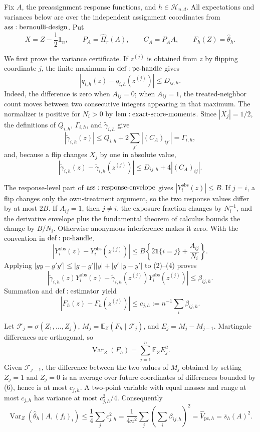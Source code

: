 Fix \(A\), the preassignment response functions, and \(h\in\mathcal H_{n,d}\).  All expectations and variances below are over the independent assignment coordinates from \({\rm ass:bernoulli\text{-}design}\).  Put
\[
 X=Z-\frac12\mathbf1_n,\qquad P_A=\widehat\Pi_r(A),\qquad C_A=P_AA,
 \qquad F_h(Z)=\widehat\theta_h.
\]

We first prove the variance certificate.  If \(z^{(j)}\) is obtained from \(z\) by flipping coordinate \(j\), the finite maximum in \({\rm def:pc\text{-}handle}\) gives
\[
 |q_{i,h}(z)-q_{i,h}(z^{(j)})|\leq D_{ij,h}.
\tag{1}
\]
Indeed, the difference is zero when \(A_{ij}=0\); when \(A_{ij}=1\), the treated-neighbor count moves between two consecutive integers appearing in that maximum.  The normalizer is positive for \(N_i>0\) by \({\rm lem:exact\text{-}score\text{-}moments}\).  Since \(|X_j|=1/2\), the definitions of \(Q_{i,h}\), \(\Gamma_{i,h}\), and \(\widetilde\gamma_{i,h}\) give
\[
 |\widetilde\gamma_{i,h}(z)|\leq Q_{i,h}+2\sum_{j'}|(C_A)_{ij'}|=\Gamma_{i,h},
\tag{2}
\]
and, because a flip changes \(X_j\) by one in absolute value,
\[
 |\widetilde\gamma_{i,h}(z)-\widetilde\gamma_{i,h}(z^{(j)})|
 \leq D_{ij,h}+4|(C_A)_{ij}|.
\tag{3}
\]

The response-level part of \({\rm ass:response\text{-}envelope}\) gives \(|Y_i^{\mathrm{obs}}(z)|\leq B\).  If \(j=i\), a flip changes only the own-treatment argument, so the two response values differ by at most \(2B\).  If \(A_{ij}=1\), then \(j\ne i\), the exposure fraction changes by \(N_i^{-1}\), and the derivative envelope plus the fundamental theorem of calculus bounds the change by \(B/N_i\).  Otherwise anonymous interference makes it zero.  With the convention in \({\rm def:pc\text{-}handle}\),
\[
 |Y_i^{\mathrm{obs}}(z)-Y_i^{\mathrm{obs}}(z^{(j)})|
 \leq B\left\{2\mathbf1\{i=j\}+\frac{A_{ij}}{N_i}\right\}.
\tag{4}
\]
Applying \(|gy-g'y'|\leq|g-g'||y|+|g'||y-y'|\) to (2)--(4) proves
\[
 |\widetilde\gamma_{i,h}(z)Y_i^{\mathrm{obs}}(z)
 -\widetilde\gamma_{i,h}(z^{(j)})Y_i^{\mathrm{obs}}(z^{(j)})|
 \leq\beta_{ij,h}.
\tag{5}
\]
Summation and \({\rm def:estimator}\) yield
\[
 |F_h(z)-F_h(z^{(j)})|
 \leq c_{j,h}:=n^{-1}\sum_i\beta_{ij,h}.
\tag{6}
\]

Let \(\mathcal F_j=\sigma(Z_1,\ldots,Z_j)\), \(M_j=\mathbb E_Z(F_h\mid\mathcal F_j)\), and \(E_j=M_j-M_{j-1}\).  Martingale differences are orthogonal, so
\[
 \operatorname{Var}_Z(F_h)=\sum_{j=1}^n\mathbb E_ZE_j^2.
\tag{7}
\]
Given \(\mathcal F_{j-1}\), the difference between the two values of \(M_j\) obtained by setting \(Z_j=1\) and \(Z_j=0\) is an average over future coordinates of differences bounded by (6), hence is at most \(c_{j,h}\).  A two-point variable with equal masses and range at most \(c_{j,h}\) has variance at most \(c_{j,h}^2/4\).  Consequently
\[
 \operatorname{Var}_Z(\widehat\theta_h\mid A,(f_i)_i)
 \leq\frac14\sum_jc_{j,h}^2
 =\frac1{4n^2}\sum_j\left(\sum_i\beta_{ij,h}\right)^2
 =\widehat V_{\mathrm{pc},h}=\overline s_h(A)^2.
\tag{8}
\]

